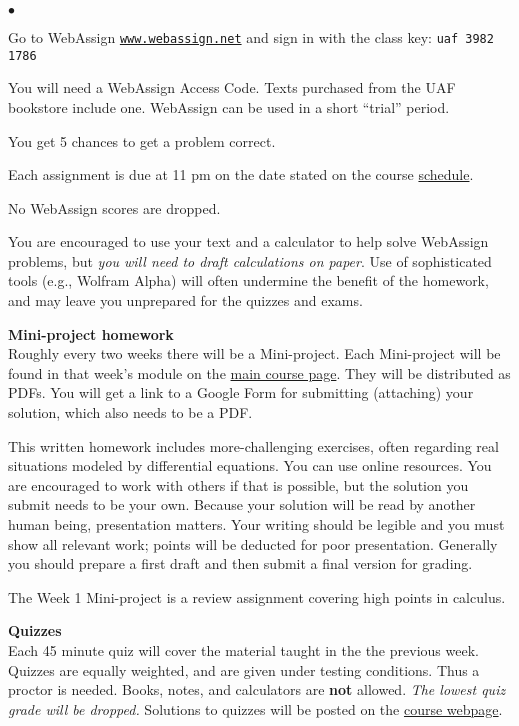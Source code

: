\documentclass[12pt]{article}
\renewcommand{\emph}[1]{\textsf{\textbf{#1}}}
\newcommand{\localhead}[1]{\par\smallskip\textbf{#1}\nobreak\\}%
\def\subheading#1{\localhead{\emph{#1}}}
\newenvironment{clist}%
{\bgroup\parskip 0pt\begin{list}{$\bullet$}{\partopsep 4pt\topsep 0pt\itemsep -2pt}}%
{\end{list}\egroup}%
\begin{document}
\begin{clist}
\item Go to WebAssign \href{https://www.webassign.net/}{\tt www.webassign.net} and sign in with the class key: \quad \texttt{uaf 3982 1786}
\item You will need a WebAssign Access Code.  Texts purchased from the UAF bookstore include one.  WebAssign can be used in a short ``trial'' period.
\item You get 5 chances to get a problem correct. 
\item Each assignment is due at 11 pm on the date stated on the course \href{https://bueler.github.io/math302/schedule.pdf}{schedule}. 
\item No WebAssign scores are dropped.
\end{clist}

You are encouraged to use your text and a calculator to help solve WebAssign problems, but \textsl{you will need to draft calculations on paper}.  Use of sophisticated tools (e.g., Wolfram Alpha) will often undermine the benefit of the homework, and may leave you unprepared for the quizzes and exams.

\subheading{Mini-project homework}
Roughly every two weeks there will be a Mini-project.  Each Mini-project will be found in that week's module on the \href{https://bueler.github.io/math302/}{main course page}.  They will be distributed as PDFs.  You will get a link to a Google Form for submitting (attaching) your solution, which also needs to be a PDF.

This written homework includes more-challenging exercises, often regarding real situations modeled by differential equations.  You can use online resources.  You are encouraged to work with others if that is possible, but the solution you submit needs to be your own.  Because your solution will be read by another human being, presentation matters.  Your writing should be legible and you must show all relevant work; points will be deducted for poor presentation.  Generally you should prepare a first draft and then submit a final version for grading.

The Week 1 Mini-project is a review assignment covering high points in calculus.

\subheading{Quizzes}
Each 45 minute quiz will cover the material taught in the the previous week.  Quizzes are equally weighted, and are given under testing conditions.  Thus a proctor is needed.  Books, notes, and calculators are \emph{not} allowed.  \textsl{The lowest quiz grade will be dropped.}  Solutions to quizzes will be posted on the \href{https://bueler.github.io/math302/}{course webpage}.
\end{document}
